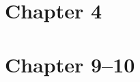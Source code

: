 \documentclass{formulae}
\begin{document}
\begin{multicols*}{2}

    \section{Chapter 4}
    

    \section{Chapter 9--10}
    

\end{multicols*}
\end{document}
